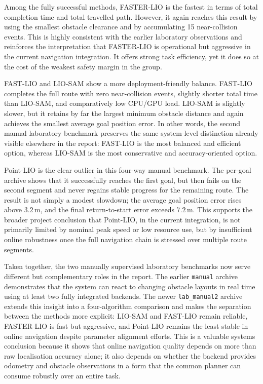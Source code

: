 \documentclass[12pt,a4paper]{report}
\begin{document}
Among the fully successful methods, FASTER-LIO is the fastest in terms of total completion time and total travelled path. However, it again reaches this result by using the smallest obstacle clearance and by accumulating 15 near-collision events. This is highly consistent with the earlier laboratory observations and reinforces the interpretation that FASTER-LIO is operational but aggressive in the current navigation integration. It offers strong task efficiency, yet it does so at the cost of the weakest safety margin in the group.

FAST-LIO and LIO-SAM show a more deployment-friendly balance. FAST-LIO completes the full route with zero near-collision events, slightly shorter total time than LIO-SAM, and comparatively low CPU/GPU load. LIO-SAM is slightly slower, but it retains by far the largest minimum obstacle distance and again achieves the smallest average goal position error. In other words, the second manual laboratory benchmark preserves the same system-level distinction already visible elsewhere in the report: FAST-LIO is the most balanced and efficient option, whereas LIO-SAM is the most conservative and accuracy-oriented option.

Point-LIO is the clear outlier in this four-way manual benchmark. The per-goal archive shows that it successfully reaches the first goal, but then fails on the second segment and never regains stable progress for the remaining route. The result is not simply a modest slowdown; the average goal position error rises above \(3.2\,\mathrm{m}\), and the final return-to-start error exceeds \(7.2\,\mathrm{m}\). This supports the broader project conclusion that Point-LIO, in the current integration, is not primarily limited by nominal peak speed or low resource use, but by insufficient online robustness once the full navigation chain is stressed over multiple route segments.

Taken together, the two manually supervised laboratory benchmarks now serve different but complementary roles in the report. The earlier \texttt{manual} archive demonstrates that the system can react to changing obstacle layouts in real time using at least two fully integrated backends. The newer \texttt{lab\_manual2} archive extends this insight into a four-algorithm comparison and makes the separation between the methods more explicit: LIO-SAM and FAST-LIO remain reliable, FASTER-LIO is fast but aggressive, and Point-LIO remains the least stable in online navigation despite parameter alignment efforts. This is a valuable systems conclusion because it shows that online navigation quality depends on more than raw localisation accuracy alone; it also depends on whether the backend provides odometry and obstacle observations in a form that the common planner can consume robustly over an entire task.
\end{document}
